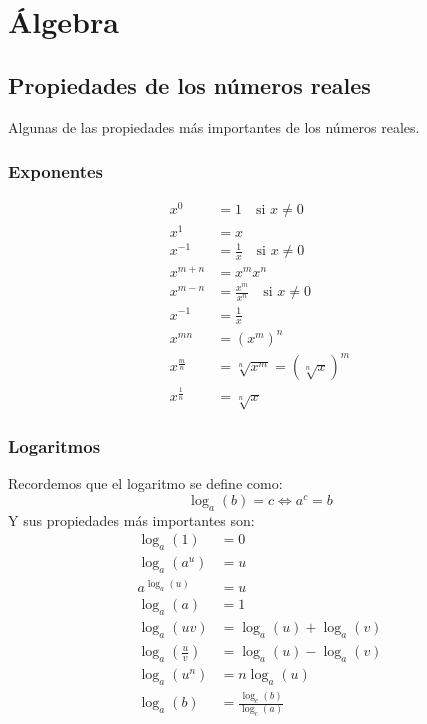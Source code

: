 \section{Álgebra}

\subsection{Propiedades de los números reales}

Algunas de las propiedades más importantes de los números reales.

\subsubsection{Exponentes}
\begin{align*}
    x^0 &= 1 \quad \text{si } x \neq 0 \\
    x^1 &= x \\
    x^{-1} &= \frac{1}{x} \quad \text{si } x \neq 0 \\
    x^{m + n} &= x^m x^n \\
    x^{m - n} &= \frac{x^m}{x^n} \quad \text{si } x \neq 0 \\
    x^{-1} &= \frac{1}{x} \\
    x^{mn} &= {(x^m)}^n \\
    x^{\frac{m}{n}} &= \sqrt[n]{x^m} = {\left(\sqrt[n]{x}\right)}^m \\
    x^{\frac{1}{n}} &= \sqrt[n]{x}
\end{align*}

\subsubsection{Logaritmos}
Recordemos que el logaritmo se define como:
\[
    \log_a(b) = c \iff a^c = b
\]
Y sus propiedades más importantes son:
\begin{align*}
    \log_a(1) &= 0 \\
    \log_a(a^u) &= u \\
    a^{\log_a(u)} &= u \\
    \log_a(a) &= 1 \\
    \log_a(uv) &= \log_a(u) + \log_a(v) \\
    \log_a\left(\frac{u}{v}\right) &= \log_a(u) - \log_a(v) \\
    \log_a(u^n) &= n \log_a(u) \\
    \log_a(b) &= \frac{\log_c(b)}{\log_c(a)}
\end{align*}

